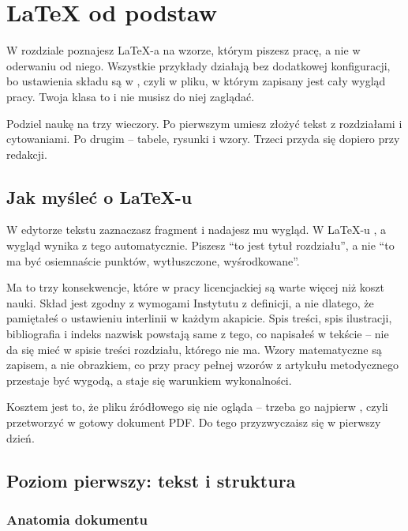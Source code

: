 \chapter{LaTeX od podstaw}\label{ch:latex}

W rozdziale poznajesz LaTeX-a na wzorze, którym piszesz pracę, a nie w oderwaniu od niego. Wszystkie przykłady działają bez dodatkowej konfiguracji, bo ustawienia składu są w , czyli w pliku, w którym zapisany jest cały wygląd pracy. Twoja klasa to  i nie musisz do niej zaglądać.

Podziel naukę na trzy wieczory. Po pierwszym umiesz złożyć tekst z rozdziałami i cytowaniami. Po drugim -- tabele, rysunki i wzory. Trzeci przyda się dopiero przy redakcji.

\section{Jak myśleć o LaTeX-u}

W edytorze tekstu zaznaczasz fragment i nadajesz mu wygląd. W LaTeX-u , a wygląd wynika z tego automatycznie. Piszesz \enquote{to jest tytuł rozdziału}, a nie \enquote{to ma być osiemnaście punktów, wytłuszczone, wyśrodkowane}.

Ma to trzy konsekwencje, które w pracy licencjackiej są warte więcej niż koszt nauki. Skład jest zgodny z wymogami Instytutu z definicji, a nie dlatego, że pamiętałeś o ustawieniu interlinii w każdym akapicie. Spis treści, spis ilustracji, bibliografia i indeks nazwisk powstają same z tego, co napisałeś w tekście -- nie da się mieć w spisie treści rozdziału, którego nie ma. Wzory matematyczne są zapisem, a nie obrazkiem, co przy pracy pełnej wzorów z artykułu metodycznego przestaje być wygodą, a staje się warunkiem wykonalności.

Kosztem jest to, że pliku źródłowego się nie ogląda -- trzeba go najpierw , czyli przetworzyć w gotowy dokument PDF. Do tego przyzwyczaisz się w pierwszy dzień.

\section{Poziom pierwszy: tekst i struktura}

\subsection{Anatomia dokumentu}

